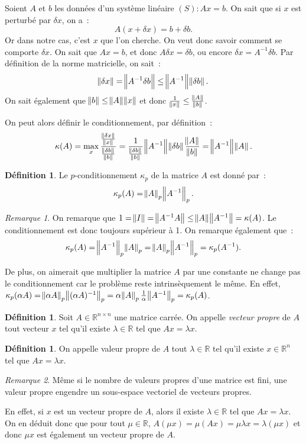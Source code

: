 \documentclass{article}
\theoremstyle{definition}
\newtheorem{déf}[thm]{Définition}
\theoremstyle{remark}
\newtheorem*{rmq}{Remarque}
\newcommand{\R}{\mathbb R}
\begin{document}
		Soient $A$ et $b$ les données d'un système linéaire $(S) : Ax = b$. On sait que si $x$ est perturbé par $\delta x$, on a~:
		\[A(x + \delta x) = b + \delta b.\]
		Or dans notre cas, c'est $x$ que l'on cherche. On veut donc savoir comment se comporte $\delta x$.
		On sait que $Ax = b$, et donc $A\delta x = \delta b$, ou encore $\delta x = A^{-1}\delta b$. Par définition de la norme matricielle, on sait~:
		\[\norm {\delta x} = \norm{A^{-1}\delta b} \leq \norm {A^{-1}} \norm{\delta b}.\]
		On sait également que $\norm b \leq \norm A\norm x$ et donc $\frac 1{\norm x} \leq \frac {\norm A}{\norm b}$.

		On peut alors définir le conditionnement, par définition~:
		\[\kappa(A) = \max_x \frac {\frac {\norm {\delta x}}{\norm x}}{\frac {\norm {\delta b}}{\norm b}}
		= \frac 1{\frac {\norm {\delta b}}{\norm b}}\norm {A^{-1}}\norm {\delta b}\frac {\norm A}{\norm b} = \norm {A^{-1}}\norm A.\]

		\begin{déf} Le $p$-conditionnement $\kappa_p$ de la matrice $A$ est donné par~:
		\[\kappa_p(A) = \norm A_p\norm{A^{-1}}_p.\]
		\end{déf}

		\begin{rmq} On remarque que $1 = \norm I = \norm{A^{-1}A} \leq \norm A\norm{A^{-1}} = \kappa(A)$. Le conditionnement est donc toujours supérieur à 1.
		On remarque également que~:
		\[\kappa_p(A) = \norm{A^{-1}}_p\norm A_p = \norm A_p\norm{A^{-1}}_p = \kappa_p(A^{-1}).\]

		De plus, on aimerait que multiplier la matrice $A$ par une constante ne change pas le conditionnement car le problème reste intrinsèquement le même.
		En effet, $\kappa_p(\alpha A) = \norm{\alpha A}_p\norm{(\alpha A)^{-1}}_p = \alpha\norm A_p\frac 1\alpha\norm{A^{-1}}_p = \kappa_p(A)$.
		\end{rmq}

		\begin{déf} Soit $A \in \R^{n \times n}$ une matrice carrée. On appelle \emph{vecteur propre} de $A$ tout vecteur $x$ tel qu'il existe $\lambda \in \R$
		tel que $Ax = \lambda x$.
		\end{déf}

		\begin{déf} On appelle valeur propre de $A$ tout $\lambda \in \R$ tel qu'il existe $x \in \R^n$ tel que $Ax = \lambda x$. \end{déf}

		\begin{rmq} Même si le nombre de valeurs propres d'une matrice est fini, une valeur propre engendre un sous-espace vectoriel de vecteurs propres.

		En effet, si $x$ est un vecteur propre de $A$, alors il existe $\lambda \in \R$ tel que $Ax = \lambda x$. On en déduit donc que pour tout $\mu \in \R$,
		$A(\mu x) = \mu(Ax) = \mu\lambda x = \lambda (\mu x)$ et donc $\mu x$ est également un vecteur propre de $A$.
		\end{rmq}
\end{document}
